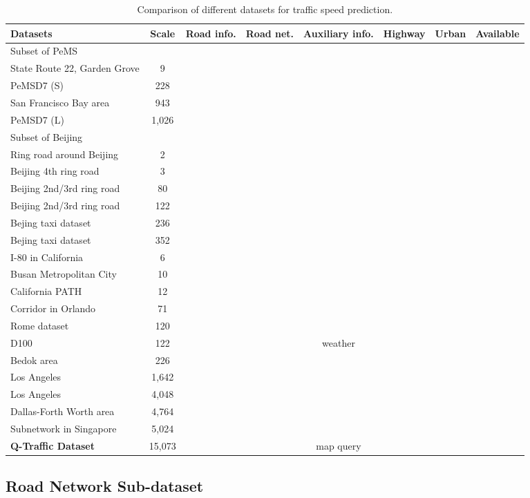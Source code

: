 \begin{table*}[htbp]
\caption{Comparison of different datasets for traffic speed prediction.}
\label{tab:cmpdatasets}

\begin{tabular}{lccccccc}
\toprule
Datasets & Scale & Road info. & Road net. & Auxiliary info. & Highway & Urban & Available\tabularnewline
\midrule
Subset of PeMS &  &  & \multirow{5}{*}{} &  & \multirow{5}{*}{} &  & \multirow{5}{*}{}\tabularnewline
State Route 22, Garden Grove \cite{yang2017ensemble} & 9 &  &  &  &  &  & \tabularnewline
PeMSD7 (S) \cite{yu2017spatio} & 228 &  &  &  &  &  & \tabularnewline
San Francisco Bay area \cite{he2013improving} & 943 &  &  &  &  &  & \tabularnewline
PeMSD7 (L) \cite{yu2017spatio} & 1,026 &  &  &  &  &  & \tabularnewline
\midrule
Subset of Beijing &  &  & \multirow{7}{*}{} &  &  &  & \tabularnewline
Ring road around Beijing \cite{ma2015long} & 2 &  &  &  &  &  & \tabularnewline
Beijing 4th ring road \cite{tang2017improved}  & 3 &  &  &  &  &  & \tabularnewline
Beijing 2nd/3rd ring road  \cite{wang2016traffic} & 80 &  &  &  &  &  & \tabularnewline
Beijing 2nd/3rd ring road \cite{wang2016traffic} & 122 &  &  &  &  &  & \tabularnewline
Bejing taxi dataset \cite{ma2017learning} & 236 &  &  &  &  &  & \tabularnewline
Bejing taxi dataset \cite{ma2017learning} & 352 &  &  &  &  &  & \tabularnewline
\midrule
I-80 in California \cite{duan2016starima} & 6 &  &  &  &  &  & \tabularnewline
Busan Metropolitan City \cite{kim2016comparison} & 10 &  &  &  &  &  & \tabularnewline
California PATH \cite{bezuglov2016short} & 12 &  &  &  &  &  & \tabularnewline
Corridor in Orlando \cite{qi2014hidden} & 71 &  &  &  &  &  & \tabularnewline
Rome dataset \cite{fusco2016short} & 120 &  &  &  &  &  & \tabularnewline
D100 \cite{gulaccar2016short} & 122 &  &  & weather &  &  & \tabularnewline
Bedok area \cite{dauwels2014predicting} & 226 &  &  &  &  &  & \tabularnewline
Los Angeles \cite{deng2016latent} & 1,642 &  &  &  &  &  & \tabularnewline
Los Angeles \cite{deng2016latent} & 4,048 &  &  &  &  &  & \tabularnewline
Dallas-Forth Worth area \cite{hasanzadeh2017graph} & 4,764 &  &  &  &  &  & \tabularnewline
Subnetwork in Singapore \cite{asif2014spatiotemporal} & 5,024 &  &  &  &  &  & \tabularnewline
\midrule
\textbf{Q-Traffic Dataset} & 15,073 &  &  & map query &  &  & \tabularnewline
\toprule
\end{tabular}

\end{table*}


\subsection{Road Network Sub-dataset}

